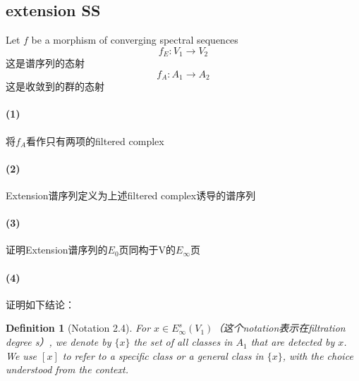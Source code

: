 \documentclass[12pt,a4paper]{article}
\title{}
\author{}
\newtheorem{defn}[equation]{Definition}
\begin{document}
\sffamily
\maketitle
\thispagestyle{empty}

\abstract{}
\tableofcontents

\large

\begin{sloppy}
 \section{extension SS} \label{ess}
Let $f$ be a morphism of converging spectral sequences
$$f_E: V_1\rightarrow V_2$$
这是谱序列的态射
$$f_A:A_1\rightarrow A_2$$
这是收敛到的群的态射

\paragraph{(1)} 将$f_A$看作只有两项的filtered complex

\paragraph{(2)} Extension谱序列定义为上述filtered complex诱导的谱序列

\paragraph{(3)} 证明Extension谱序列的$E_0$页同构于V的$E_\infty$页

\paragraph{(4)}证明如下结论：


\begin{defn}[Notation 2.4]
For $x \in E_\infty^{s}(V_1)$（这个notation表示在filtration degree s）, we denote by $\{x\}$ the set of all classes in $A_1$ that are detected by $x$. We use $[x]$ to refer to a specific class or a general class in $\{x\}$, with the choice understood from the context.
\end{defn}


\end{sloppy}
\end{document}
